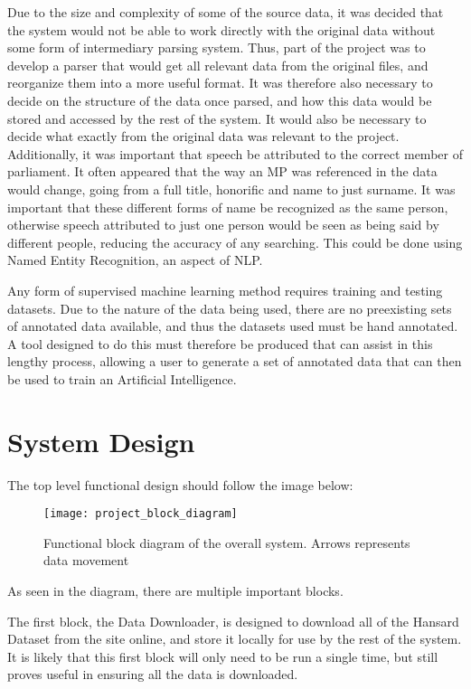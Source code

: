 Due to the size and complexity of some of the source data, it was decided that the system would not be able to work directly with the original data without some form of intermediary parsing system. Thus, part of the project was to develop a parser that would get all relevant data from the original files, and reorganize them into a more useful format. It was therefore also necessary to decide on the structure of the data once parsed, and how this data would be stored and accessed by the rest of the system. It would also be necessary to decide what exactly from the original data was relevant to the project.
Additionally, it was important that speech be attributed to the correct member of parliament. It often appeared that the way an MP was referenced in the data would change, going from a full title, honorific and name to just surname. It was important that these different forms of name be recognized as the same person, otherwise speech attributed to just one person would be seen as being said by different people, reducing the accuracy of any searching. This could be done using Named Entity Recognition, an aspect of NLP.

Any form of supervised machine learning method requires training and testing datasets. Due to the nature of the data being used, there are no preexisting sets of annotated data available, and thus the datasets used must be hand annotated. A tool designed to do this must therefore be produced that can assist in this lengthy process, allowing a user to generate a set of annotated data that can then be used to train an Artificial Intelligence.
\newpage
\section{System Design}
The top level functional design should follow the image below:

\begin{figure}[h]
	\texttt{[image: project\_block\_diagram]}
	\caption{Functional block diagram of the overall system. Arrows represents data movement}
\end{figure}

As seen in the diagram, there are multiple important blocks.

The first block, the Data Downloader, is designed to download all of the Hansard Dataset from the site online, and store it locally for use by the rest of the system. It is likely that this first block will only need to be run a single time, but still proves useful in ensuring all the data is downloaded.

